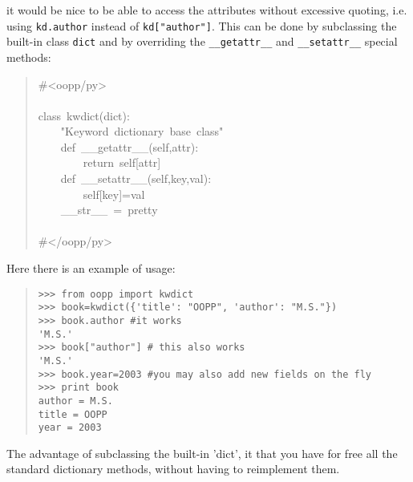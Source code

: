 \documentclass[10pt,english]{article}
\begin{document}
it would be nice to be able to access the attributes without
excessive quoting, i.e. using \texttt{kd.author} instead of \texttt{kd["author"]}.
This can be done by subclassing the built-in class \texttt{dict} and
by overriding the \texttt{{\_}{\_}getattr{\_}{\_}} and \texttt{{\_}{\_}setattr{\_}{\_}} special methods:
\begin{quote}
\begin{ttfamily}\begin{flushleft}
\mbox{{\#}<oopp/py>}\\
\mbox{}\\
\mbox{class~kwdict(dict):}\\
\mbox{~~~~"Keyword~dictionary~base~class"}\\
\mbox{~~~~def~{\_}{\_}getattr{\_}{\_}(self,attr):~}\\
\mbox{~~~~~~~~return~self[attr]}\\
\mbox{~~~~def~{\_}{\_}setattr{\_}{\_}(self,key,val):~}\\
\mbox{~~~~~~~~self[key]=val}\\
\mbox{~~~~{\_}{\_}str{\_}{\_}~=~pretty~}\\
\mbox{}\\
\mbox{{\#}</oopp/py>}
\end{flushleft}\end{ttfamily}
\end{quote}

Here there is an example of usage:
\begin{quote}
\begin{verbatim}>>> from oopp import kwdict
>>> book=kwdict({'title': "OOPP", 'author': "M.S."})
>>> book.author #it works
'M.S.'
>>> book["author"] # this also works
'M.S.'
>>> book.year=2003 #you may also add new fields on the fly
>>> print book
author = M.S.
title = OOPP
year = 2003\end{verbatim}
\end{quote}

The advantage of subclassing the built-in 'dict', it that you have for free 
all the standard dictionary methods, without having to reimplement them.
\end{document}
